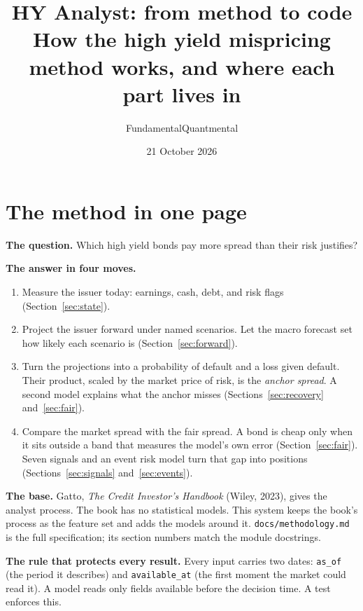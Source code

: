 \documentclass[11pt,a4paper]{article}
\title{HY Analyst: from method to code\\[2pt]\large How the high yield mispricing method works, and where each part lives in \code{hy/}}
\author{FundamentalQuantmental}
\date{21 October 2026}
\newcommand{\code}[1]{\texttt{\small #1}}
\begin{document}
\maketitle

\section*{The method in one page}

\textbf{The question.} Which high yield bonds pay more spread than their risk justifies?

\textbf{The answer in four moves.}
\begin{enumerate}
\item Measure the issuer today: earnings, cash, debt, and risk flags (Section~\ref{sec:state}).
\item Project the issuer forward under named scenarios. Let the macro forecast set how likely each scenario is (Section~\ref{sec:forward}).
\item Turn the projections into a probability of default and a loss given default. Their product, scaled by the market price of risk, is the \emph{anchor spread}. A second model explains what the anchor misses (Sections~\ref{sec:recovery} and~\ref{sec:fair}).
\item Compare the market spread with the fair spread. A bond is cheap only when it sits outside a band that measures the model's own error (Section~\ref{sec:fair}). Seven signals and an event risk model turn that gap into positions (Sections~\ref{sec:signals} and~\ref{sec:events}).
\end{enumerate}

\textbf{The base.} Gatto, \emph{The Credit Investor's Handbook} (Wiley, 2023), gives the analyst process. The book has no statistical models. This system keeps the book's process as the feature set and adds the models around it. \code{docs/methodology.md} is the full specification; its section numbers match the module docstrings.

\textbf{The rule that protects every result.} Every input carries two dates: \code{as\_of} (the period it describes) and \code{available\_at} (the first moment the market could read it). A model reads only fields available before the decision time. A test enforces this.
\end{document}
